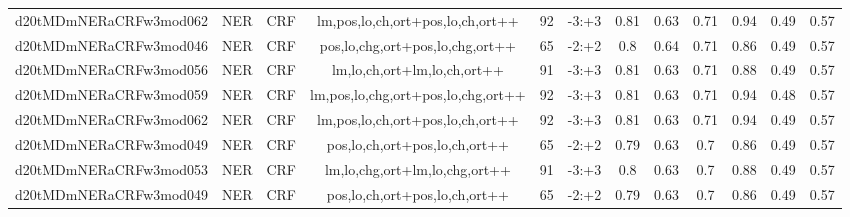 \documentclass[a4paper]{article}
\begin{document}
\begin{landscape}
\begin{center}
\begin{tabular}{ |c|c|c|c|c|c|c|c|c|c|c|c|}
 	
 
 	
 		
 		\small{ d20tMDmNERaCRFw3mod062 } & NER & CRF & lm,pos,lo,ch,ort+pos,lo,ch,ort++  &  92 &  -3:+3  &  0.81 & 0.63 & 0.71  &  0.94 & 0.49 & 0.57 \\
 		

 	
 
 	
 		
 		\small{ d20tMDmNERaCRFw3mod046 } & NER & CRF & pos,lo,chg,ort+pos,lo,chg,ort++  &  65 &  -2:+2  &  0.8 & 0.64 & 0.71  &  0.86 & 0.49 & 0.57 \\
 		

 	
 
 	
 		
 		\small{ d20tMDmNERaCRFw3mod056 } & NER & CRF & lm,lo,ch,ort+lm,lo,ch,ort++  &  91 &  -3:+3  &  0.81 & 0.63 & 0.71  &  0.88 & 0.49 & 0.57 \\
 		

 	
 
 	
 		
 		\small{ d20tMDmNERaCRFw3mod059 } & NER & CRF & lm,pos,lo,chg,ort+pos,lo,chg,ort++  &  92 &  -3:+3  &  0.81 & 0.63 & 0.71  &  0.94 & 0.48 & 0.57 \\
 		

 	
 
 	
 		
 		\small{ d20tMDmNERaCRFw3mod062 } & NER & CRF & lm,pos,lo,ch,ort+pos,lo,ch,ort++  &  92 &  -3:+3  &  0.81 & 0.63 & 0.71  &  0.94 & 0.49 & 0.57 \\
 		

 	
 
 	
 		
 		\small{ d20tMDmNERaCRFw3mod049 } & NER & CRF & pos,lo,ch,ort+pos,lo,ch,ort++  &  65 &  -2:+2  &  0.79 & 0.63 & 0.7  &  0.86 & 0.49 & 0.57 \\
 		

 	
 
 	
 		
 		\small{ d20tMDmNERaCRFw3mod053 } & NER & CRF & lm,lo,chg,ort+lm,lo,chg,ort++  &  91 &  -3:+3  &  0.8 & 0.63 & 0.7  &  0.88 & 0.49 & 0.57 \\
 		

 	
 
 	
 		
 		\small{ d20tMDmNERaCRFw3mod049 } & NER & CRF & pos,lo,ch,ort+pos,lo,ch,ort++  &  65 &  -2:+2  &  0.79 & 0.63 & 0.7  &  0.86 & 0.49 & 0.57 \\
 		

 	
 

\end{tabular}
\end{center}
\end{landscape}
\end{document}
